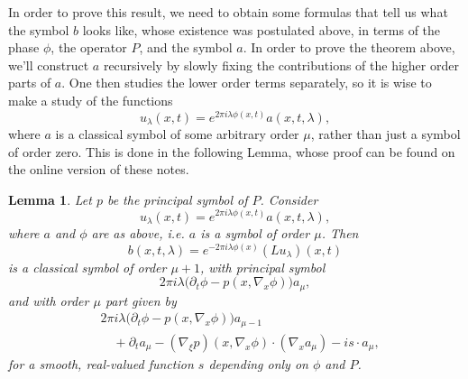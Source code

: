 \documentclass{article}
\theoremstyle{plain}
\newtheorem{lemma}[theorem]{Lemma}
\theoremstyle{remark}
\theoremstyle{definition}
\begin{document}
In order to prove this result, we need to obtain some formulas that tell us what the symbol $b$ looks like, whose existence was postulated above, in terms of the phase $\phi$, the operator $P$, and the symbol $a$. In order to prove the theorem above, we'll construct $a$ recursively by slowly fixing the contributions of the higher order parts of $a$. One then studies the lower order terms separately, so it is wise to make a study of the functions
%
\[ u_\lambda(x,t) = e^{2 \pi i \lambda \phi(x,t)} a(x,t,\lambda),\]
%
where $a$ is a classical symbol of some arbitrary order $\mu$, rather than just a symbol of order zero. This is done in the following Lemma, whose proof can be found on the online version of these notes.

\begin{lemma}
	Let $p$ be the principal symbol of $P$. Consider
	\[ u_\lambda(x,t) = e^{2 \pi i \lambda \phi(x,t)} a(x,t,\lambda), \]
	where $a$ and $\phi$ are as above, i.e. $a$ is a symbol of order $\mu$. Then
	\[ b(x,t,\lambda) = e^{-2 \pi i \lambda \phi(x)} (L u_\lambda)(x,t) \]
	is a classical symbol of order $\mu+1$, with principal symbol
	\[ 2\pi i \lambda \Big( \partial_t \phi - p \left( x, \nabla_x \phi \right) \Big) a_\mu, \]
	and with order $\mu$ part given by
	\begin{align*}
		&2 \pi i \lambda \Big( \partial_t \phi - p \left( x, \nabla_x \phi \right) \Big) a_{\mu - 1}\\
		&\quad + \partial_t a_\mu -  (\nabla_\xi p)(x, \nabla_x \phi) \cdot (\nabla_x a_\mu) - i s \cdot a_\mu,
	\end{align*}
	for a smooth, real-valued function $s$ depending only on $\phi$ and $P$.
\end{lemma}
\end{document}
